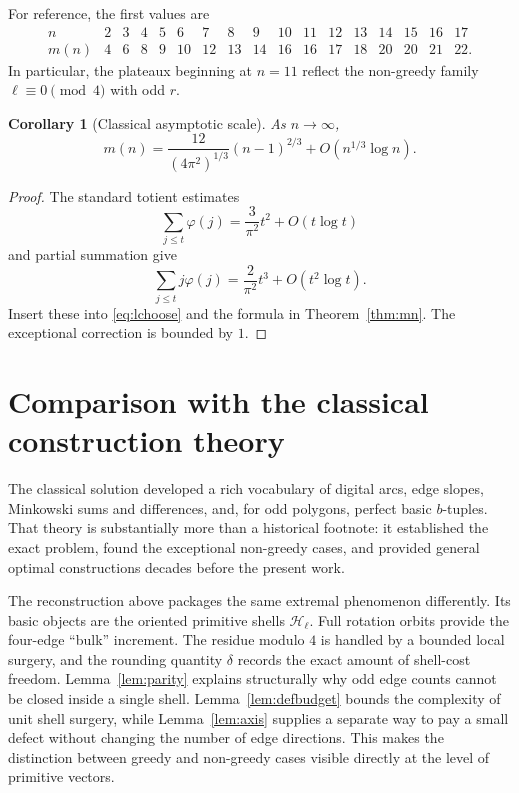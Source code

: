 \documentclass[11pt]{article}
\newtheorem{corollary}[theorem]{Corollary}
\theoremstyle{definition}
\newcommand{\HH}{\mathcal H}
\newcommand{\ph}{\varphi}
\begin{document}
For reference, the first values are
\[
\begin{array}{c|cccccccccccccccc}
n&2&3&4&5&6&7&8&9&10&11&12&13&14&15&16&17\\
\hline
m(n)&4&6&8&9&10&12&13&14&16&16&17&18&20&20&21&22.
\end{array}
\]
In particular, the plateaux beginning at \(n=11\) reflect the non-greedy family
\(\ell\equiv0\pmod4\) with odd \(r\).

\begin{corollary}[Classical asymptotic scale]\label{cor:asymp}
As \(n\to\infty\),
\[
m(n)
=
\frac{12}{(4\pi^2)^{1/3}}(n-1)^{2/3}
+
O\!\left(n^{1/3}\log n\right).
\]
\end{corollary}

\begin{proof}
The standard totient estimates
\[
\sum_{j\le t}\ph(j)=\frac{3}{\pi^2}t^2+O(t\log t)
\]
and partial summation give
\[
\sum_{j\le t}j\ph(j)=\frac{2}{\pi^2}t^3+O(t^2\log t).
\]
Insert these into \eqref{eq:lchoose} and the formula in Theorem~\ref{thm:mn}.  The exceptional correction is bounded by \(1\).
\end{proof}

\section{Comparison with the classical construction theory}

The classical solution developed a rich vocabulary of digital arcs, edge slopes, Minkowski sums and differences, and, for odd polygons, perfect basic \(b\)-tuples.  That theory is substantially more than a historical footnote: it established the exact problem, found the exceptional non-greedy cases, and provided general optimal constructions decades before the present work.

The reconstruction above packages the same extremal phenomenon differently.  Its basic objects are the oriented primitive shells \(\HH_\ell\).  Full rotation orbits provide the four-edge ``bulk'' increment.  The residue modulo \(4\) is handled by a bounded local surgery, and the rounding quantity \(\delta\) records the exact amount of shell-cost freedom.  Lemma~\ref{lem:parity} explains structurally why odd edge counts cannot be closed inside a single shell.  Lemma~\ref{lem:defbudget} bounds the complexity of unit shell surgery, while Lemma~\ref{lem:axis} supplies a separate way to pay a small defect without changing the number of edge directions.  This makes the distinction between greedy and non-greedy cases visible directly at the level of primitive vectors.
\end{document}
